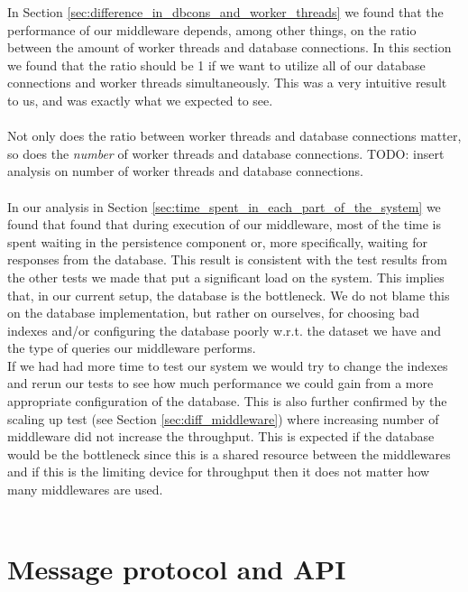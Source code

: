 \documentclass{article}
\begin{document}
        In Section \ref{sec:difference_in_dbcons_and_worker_threads} we found that the performance of our middleware depends, among other things, on the ratio between the amount of worker threads and database connections. In this section we found that the ratio should be 1 if we want to utilize all of our database connections and worker threads simultaneously. This was a very intuitive result to us, and was exactly what we expected to see.\\
        \\
        Not only does the ratio between worker threads and database connections matter, so does the \textit{number} of worker threads and database connections. TODO: insert analysis on number of worker threads and database connections.\\
        \\
        In our analysis in Section \ref{sec:time_spent_in_each_part_of_the_system} we found that found that during execution of our middleware, most of the time is spent waiting in the persistence component or, more specifically, waiting for responses from the database. This result is consistent with the test results from the other tests we made that put a significant load on the system. This implies that, in our current setup, the database is the bottleneck. We do not blame this on the database implementation, but rather on ourselves, for choosing bad indexes and/or configuring the database poorly w.r.t. the dataset we have and the type of queries our middleware performs.\\
        If we had had more time to test our system we would try to change the indexes and rerun our tests to see how much performance we could gain from a more appropriate configuration of the database. This is also further confirmed by the scaling up test (see Section \ref{sec:diff_middleware}) where increasing number of middleware did not increase the throughput. This is expected if the database would be the bottleneck since this is a shared resource between the middlewares and if this is the limiting device for throughput then it does not matter how many middlewares are used.\\
        \\
    \clearpage
    \appendix
        \section{Message protocol and API}
        \label{sec:message_protocol_api}
\end{document}
